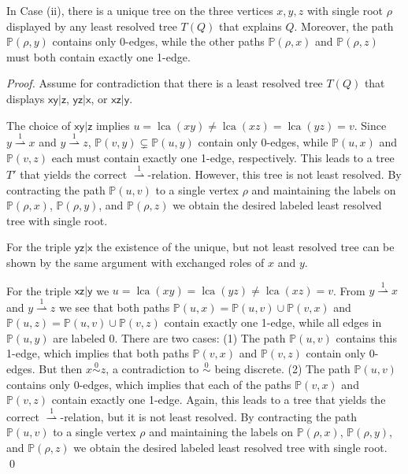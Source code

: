 \documentclass[smallextended]{svjour3}
\newcommand{\Ro}{\mathrel{\overset{0}{\sim}}}
\newcommand{\Rld}{\mathrel{\overset{1}{\rightharpoonup}}}
\renewcommand{\P}{\mathbb{P}}
\newcommand{\lca}[1]{\mathop{lca}(#1)}
\newcommand{\rt}[1]{\ensuremath{\mathsf{#1}}}
\begin{document}
\begin{lemma}
  In Case (ii), there is a unique tree on the three vertices $x,y,z$
  with single root $\rho$ displayed by any least resolved tree $T(Q)$ that
  explains $Q$.  Moreover, the path $\P(\rho,y)$ contains only 0-edges,
  while the other paths $\P(\rho,x)$ and $\P(\rho,z)$ must both contain
  exactly one 1-edge.
  \label{lem:case-ii}
\end{lemma}
\begin{proof}
  Assume for contradiction that there is a least resolved tree $T(Q)$
  that displays $\rt{xy|z}$, $\rt{yz|x}$, or $\rt{xz|y}$. 

  The choice of $\rt{xy|z}$ implies $u=\lca{xy}\neq \lca{xz}=\lca{yz}=v$.
  Since $y\Rld x$ and $y\Rld z$, $\P(v,y) \subsetneq \P(u,y)$ contain only
  0-edges, while $\P(u,x)$ and $\P(v,z)$ each must contain exactly one
  1-edge, respectively.  This leads to a tree $T'$ that yields the correct
  $\Rld$-relation.  However, this tree is not least resolved.  By
  contracting the path $\P(u,v)$ to a single vertex $\rho$ and maintaining
  the labels on $\P(\rho,x)$, $\P(\rho,y)$, and $\P(\rho,z)$ we obtain the
  desired labeled least resolved tree with single root.
	
  For the triple $\rt{yz|x}$ the existence of the unique, but not least
  resolved tree can be shown by the same argument with exchanged roles of
  $x$ and $y$.
	
  For the triple $\rt{xz|y}$ we $u = \lca{xy} = \lca{yz} \neq \lca{xz} =
  v$. From $y\Rld x$ and $y\Rld z$ we see that both paths $\P(u,x) =
  \P(u,v)\cup \P(v,x)$ and $\P(u,z) = \P(u,v)\cup \P(v,z)$ contain exactly
  one 1-edge, while all edges in $\P(u,y)$ are labeled $0$.  There are two
  cases: (1) The path $\P(u,v)$ contains this 1-edge, which implies that
  both paths $\P(v,x)$ and $\P(v,z)$ contain only 0-edges. But then $x\Ro
  z$, a contradiction to $\Ro$ being discrete.  (2) The path $\P(u,v)$
  contains only 0-edges, which implies that each of the paths $\P(v,x)$ and
  $\P(v,z)$ contain exactly one 1-edge. Again, this leads to a tree that
  yields the correct $\Rld$-relation, but it is not least resolved.  By
  contracting the path $\P(u,v)$ to a single vertex $\rho$ and maintaining
  the labels on $\P(\rho,x)$, $\P(\rho,y)$, and $\P(\rho,z)$ we obtain the
  desired labeled least resolved tree with single root.  \qed
\end{proof}
\end{document}
